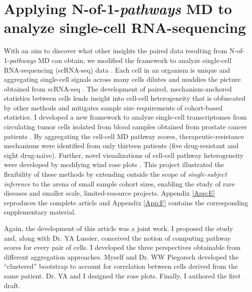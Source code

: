 \chapter{Applying N-of-1-\emph{pathways} MD to\\analyze single-cell RNA-sequencing} \label{Chap:ctcs}

\indent \indent With an aim to discover what other insights the paired data resulting from N-of-1-\emph{pathways} MD can obtain, we modified the framework to analyze single-cell RNA-sequencing (scRNA-seq) data \citep{Tang2009}. Each cell in an organism is unique and aggregating single-cell signals across many cells dilutes and muddies the picture obtained from scRNA-seq \citep{Schubert2011}. The development of paired, mechanism-anchored statistics between cells lends insight into cell-cell heterogeneity that is obfuscated by other methods and mitigates sample size requirements of cohort-based statistics. I developed a new framework to analyze single-cell transcriptomes from circulating tumor cells isolated from blood samples obtained from prostate cancer patients \citep{Patel2014,Schissler2016}. By aggregating the cell-cell MD pathway scores, therapeutic-resistance mechanisms were identified from only thirteen patients (five drug-resistant and eight drug-na\"{\i}ve). Further, novel visualizations of cell-cell pathway heterogeneity were developed by modifying wind rose plots \citep{Court1963}. This project illustrated the flexibility of these methods by extending outside the scope of \emph{single-subject inference} to the arena of small sample cohort sizes, enabling the study of rare diseases and smaller scale, limited-resource projects. Appendix \ref{App:E} reproduces the complete \citet{Schissler2016} article and Appendix \ref{App:F} contains the corresponding supplementary material.

Again, the development of this article was a joint work. I proposed the study and, along with Dr. YA Lussier, conceived the notion of computing pathway scores for every pair of cells. I developed the three perspectives obtainable from different aggregation approaches. Myself and Dr. WW Piegorsch developed the ``clustered'' bootstrap to account for correlation between cells derived from the same patient. Dr. YA and I designed the rose plots. Finally, I authored the first draft.
